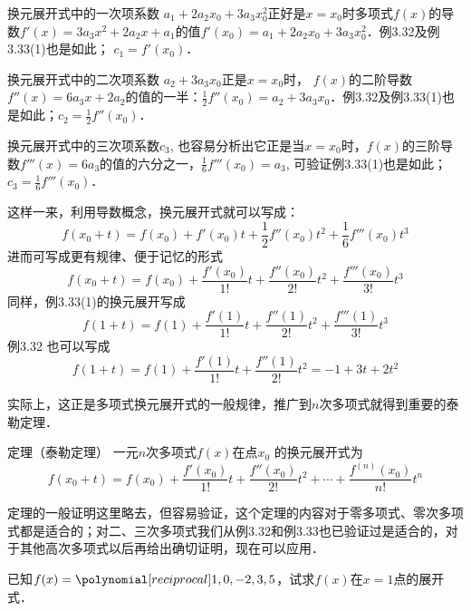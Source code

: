 换元展开式中的一次项系数 $a_1+2a_2x_0+3a_3x_0^2$正好是$x=x_0$时多项式$f(x)$的导数$f'(x)=3a_3x^2+2a_2x+a_1$的值$f'(x_0)=a_1+2a_2x_0+3a_3x_0^2$．例3.32及例3.33(1)也是如此；
$c_1 =f' (x_0)$．

换元展开式中的二次项系数 $a_2+3a_3x_0$正是$x=x_0$时，
$f(x)$的二阶导数$f''(x)=6a_3x+2a_2$的值的一半：$\frac{1}{2}f''(x_0)=a_2+3a_3x_0$．例3.32及例3.33(1)也是如此；$c_2=\frac{1}{2}f''(x_0)$．

换元展开式中的三次项系数$c_3$, 也容易分析出它正是当$x=x_0$时，$f(x)$的三阶导数$f'''(x)=6a_3$的值的六分之一，$\frac{1}{6}f'''(x_0)=a_3$, 可验证例3.33(1)也是如此；
$c_3=\frac{1}{6}f''' (x_0)$．

这样一来，利用导数概念，换元展开式就可以写成：
\[f(x_0+t)=f(x_0)+f'(x_0)t+\frac{1}{2}f''(x_0)t^2+\frac{1}{6}f'''(x_0)t^3\]    
进而可写成更有规律、便于记忆的形式
\[f(x_0+t)=f(x_0)+\frac{f'(x_0)}{1!}t+\frac{f''(x_0)}{2!}t^2+\frac{f'''(x_0)}{3!}t^3\]    
同样，例3.33(1)的换元展开写成
\[f (1+t) =f (1) +\frac{f'(1)}{1!}t+\frac{f''(1)}{2!}t^2+\frac{f'''(1)}{3!}t^3\]
例3.32 也可以写成
\[f (1+t) =f (1) +\frac{f'(1)}{1!}t+\frac{f''(1)}{2!}t^2=-1+3t+2t^2\]

实际上，这正是多项式换元展开式的一般规律，推广到$n$次多项式就得到重要的泰勒定理．
    
\begin{blk}{定理（泰勒定理）}
 一元$n$次多项式$f(x)$在点$x_0$
的换元展开式为
\begin{equation}
    f(x_0+t)=f(x_0)+\frac{f'(x_0)}{1!}t+\frac{f''(x_0)}{2!}t^2+\cdots+\frac{f^{(n)}(x_0)}{n!}t^n
\end{equation}   
\end{blk}

定理的一般证明这里略去，但容易验证，这个定理的内容对于零多项式、零次多项式都是适合的；对二、三次多项式我们从例3.32和例3.33也已验证过是适合的，对于其他高次多项式以后再给出确切证明，现在可以应用．

    \begin{example}
已知$f(x)=\poly{1,0,-2,3,5}$，试求$f(x)$在$x=1$点的展开式．    
    \end{example}    
    
